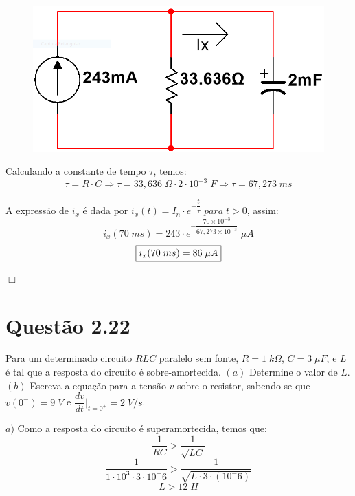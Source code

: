 \documentclass[
	12pt,				%
	oneside,			%
	a4paper,			%
	english,			%
	french,				%
	spanish,			%
	brazil				%
	]{abntex2}
\begin{document}
\begin{figure}[htb]
	\centering
	\includegraphics[scale=0.3]{Circuito_2-19(g).PNG}
\end{figure}

Calculando a constante de tempo $\tau$, temos:
$$\tau=R \cdot C \Longrightarrow \tau=33,636\;\Omega \cdot 2\cdot 10^{-3}\;F \Longrightarrow \tau = 67,273\;ms$$


A expressão de $i_x$ é dada por $i_x(t)=I_n \cdot e^{-\dfrac{t}{\tau}}\;para\;t>0$, assim:
$$i_x(70\;ms)=243 \cdot e^{-\dfrac{70\times10^{-3}}{67,273\times10^{-3}}}\;\mu A$$
\begin{equation}
    \fbox{$i_x(70\;ms)=86 \;\mu A$}
\end{equation}

\begin{flushright}
    $\Box$
\end{flushright}
\newpage

\section*{Questão 2.22}
Para um determinado circuito $RLC$ paralelo sem fonte, $R=1\;k\Omega$, $C = 3\;\mu F$, e $L$ é tal que a resposta do circuito é sobre-amortecida. $(a)$ Determine o valor de $L$. $(b)$ Escreva a equação para a tensão $v$ sobre o resistor, sabendo-se que $v(0^-) = 9\;V$ e $\dfrac{dv}{dt} \Bigg|_{t=0^+}^{} = 2 \;V/s$.

$a)$ Como a resposta do circuito é superamortecida, temos que:
$${\dfrac{1}{RC}}>{\dfrac{1}{\sqrt{LC}}}$$
$${\dfrac{1}{1\cdot10^3\cdot3\cdot10^-6}}>{\dfrac{1}{\sqrt{L\cdot3\cdot(10^-6)}}}$$
$$L>12\;H$$
\end{document}
